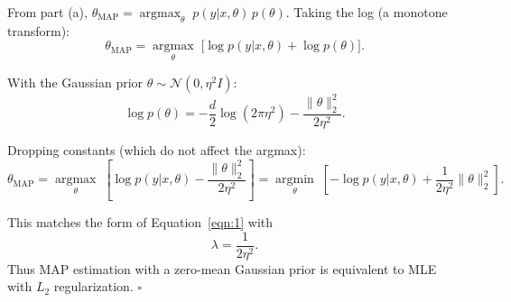 \begin{answer}
From part (a), $\theta_{\mathrm{MAP}} = \operatorname*{argmax}_\theta\; p(y|x,\theta)\,p(\theta)$. Taking the log (a monotone transform):
$$\theta_{\mathrm{MAP}} = \operatorname*{argmax}_\theta\; \bigl[\log p(y|x,\theta) + \log p(\theta)\bigr].$$

With the Gaussian prior $\theta \sim \mathcal{N}(0,\eta^2 I)$:
$$\log p(\theta) = -\frac{d}{2}\log(2\pi\eta^2) - \frac{\|\theta\|_2^2}{2\eta^2}.$$

Dropping constants (which do not affect the argmax):
$$\theta_{\mathrm{MAP}} = \operatorname*{argmax}_\theta\; \left[\log p(y|x,\theta) - \frac{\|\theta\|_2^2}{2\eta^2}\right] = \operatorname*{argmin}_\theta\; \left[-\log p(y|x,\theta) + \frac{1}{2\eta^2}\|\theta\|_2^2\right].$$

This matches the form of Equation~\eqref{eqn:1} with
$$\boxed{\lambda = \frac{1}{2\eta^2}.}$$
Thus MAP estimation with a zero-mean Gaussian prior is equivalent to MLE with $L_2$ regularization. $\square$
\end{answer}
